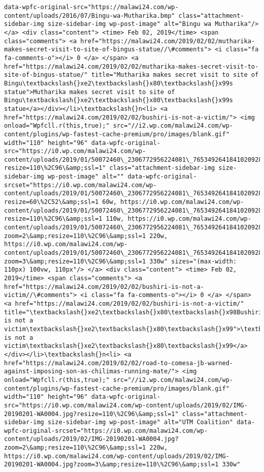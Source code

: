 \documentclass[11pt]{article}
\begin{document}
\begin{Verbatim}[commandchars=\\\{\}]
data-wpfc-original-src="https://malawi24.com/wp-content/uploads/2016/07/Bingu-wa-Mutharika.bmp" class="attachment-sidebar-img size-sidebar-img wp-post-image" alt="Bingu wa Mutharika"/> </a> <div class="content"> <time> Feb 02, 2019</time> <span class="comments"> <a href="https://malawi24.com/2019/02/02/mutharika-makes-secret-visit-to-site-of-bingus-statue//\#comments"> <i class="fa fa-comments-o"></i> 0 </a> </span> <a href="https://malawi24.com/2019/02/02/mutharika-makes-secret-visit-to-site-of-bingus-statue/" title="Mutharika makes secret visit to site of Bingu\textbackslash{}xe2\textbackslash{}x80\textbackslash{}x99s statue">Mutharika makes secret visit to site of Bingu\textbackslash{}xe2\textbackslash{}x80\textbackslash{}x99s statue</a></div></li>\textbackslash{}n<li> <a href="https://malawi24.com/2019/02/02/bushiri-is-not-a-victim/"> <img onload="Wpfcll.r(this,true);" src="//i2.wp.com/malawi24.com/wp-content/plugins/wp-fastest-cache-premium/pro/images/blank.gif" width="110" height="96" data-wpfc-original-src="https://i0.wp.com/malawi24.com/wp-content/uploads/2019/01/50072460\_2306772956224081\_7653492641841020928\_n.jpg?resize=110\%2C96\&amp;ssl=1" class="attachment-sidebar-img size-sidebar-img wp-post-image" alt="" data-wpfc-original-srcset="https://i0.wp.com/malawi24.com/wp-content/uploads/2019/01/50072460\_2306772956224081\_7653492641841020928\_n.jpg?resize=60\%2C52\&amp;ssl=1 60w, https://i0.wp.com/malawi24.com/wp-content/uploads/2019/01/50072460\_2306772956224081\_7653492641841020928\_n.jpg?resize=110\%2C96\&amp;ssl=1 110w, https://i0.wp.com/malawi24.com/wp-content/uploads/2019/01/50072460\_2306772956224081\_7653492641841020928\_n.jpg?zoom=2\&amp;resize=110\%2C96\&amp;ssl=1 220w, https://i0.wp.com/malawi24.com/wp-content/uploads/2019/01/50072460\_2306772956224081\_7653492641841020928\_n.jpg?zoom=3\&amp;resize=110\%2C96\&amp;ssl=1 330w" sizes="(max-width: 110px) 100vw, 110px"/> </a> <div class="content"> <time> Feb 02, 2019</time> <span class="comments"> <a href="https://malawi24.com/2019/02/02/bushiri-is-not-a-victim//\#comments"> <i class="fa fa-comments-o"></i> 0 </a> </span> <a href="https://malawi24.com/2019/02/02/bushiri-is-not-a-victim/" title="\textbackslash{}xe2\textbackslash{}x80\textbackslash{}x98Bushiri is not a victim\textbackslash{}xe2\textbackslash{}x80\textbackslash{}x99">\textbackslash{}xe2\textbackslash{}x80\textbackslash{}x98Bushiri is not a victim\textbackslash{}xe2\textbackslash{}x80\textbackslash{}x99</a></div></li>\textbackslash{}n<li> <a href="https://malawi24.com/2019/02/02/road-to-comesa-jb-warned-against-imposing-son-as-chilimas-running-mate/"> <img onload="Wpfcll.r(this,true);" src="//i2.wp.com/malawi24.com/wp-content/plugins/wp-fastest-cache-premium/pro/images/blank.gif" width="110" height="96" data-wpfc-original-src="https://i0.wp.com/malawi24.com/wp-content/uploads/2019/02/IMG-20190201-WA0004.jpg?resize=110\%2C96\&amp;ssl=1" class="attachment-sidebar-img size-sidebar-img wp-post-image" alt="UTM Coalition" data-wpfc-original-srcset="https://i0.wp.com/malawi24.com/wp-content/uploads/2019/02/IMG-20190201-WA0004.jpg?zoom=2\&amp;resize=110\%2C96\&amp;ssl=1 220w, https://i0.wp.com/malawi24.com/wp-content/uploads/2019/02/IMG-20190201-WA0004.jpg?zoom=3\&amp;resize=110\%2C96\&amp;ssl=1 330w" 
\end{Verbatim}
\end{document}
